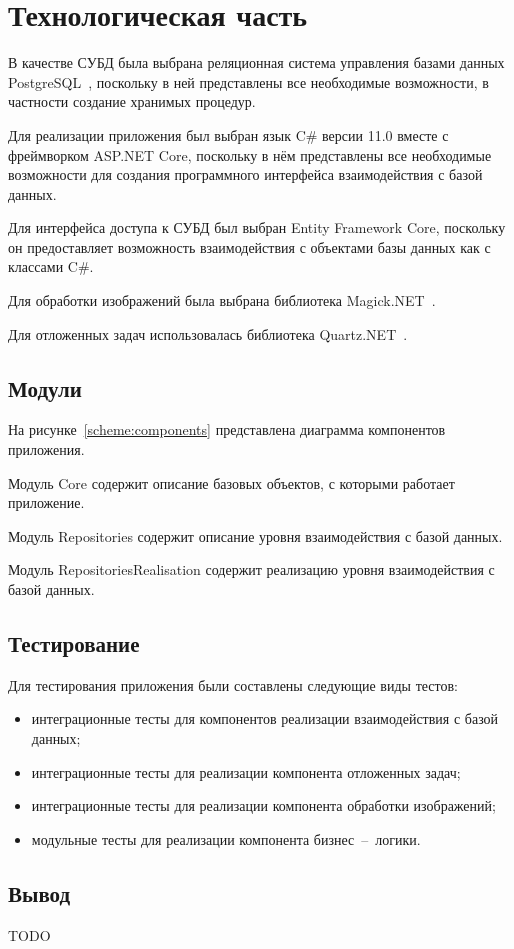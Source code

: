 \chapter{Технологическая часть}

В качестве СУБД была выбрана реляционная система управления базами данных PostgreSQL~\cite{postgresql}, поскольку в ней представлены все необходимые возможности, в частности создание хранимых процедур.

Для реализации приложения был выбран язык C\# версии 11.0 вместе с фреймворком ASP.NET Core, поскольку в нём представлены все необходимые возможности для создания программного интерфейса взаимодействия с базой данных.

Для интерфейса доступа к СУБД был выбран Entity Framework Core, поскольку он предоставляет возможность взаимодействия с объектами базы данных как с классами C\#.

Для обработки изображений была выбрана библиотека Magick.NET~\cite{magicknet}. 

Для отложенных задач использовалась библиотека Quartz.NET~\cite{quartznet}.

\section{Модули}
На рисунке~\ref{scheme:components} представлена диаграмма компонентов приложения.

Модуль Core содержит описание базовых объектов, с которыми работает приложение.

Модуль Repositories содержит описание уровня взаимодействия с базой данных. 

Модуль RepositoriesRealisation содержит реализацию уровня взаимодействия с базой данных. 

\section{Тестирование}

Для тестирования приложения были составлены следующие виды тестов:
\begin{itemize}
	\item интеграционные тесты для компонентов реализации взаимодействия с базой данных;
	\item интеграционные тесты для реализации компонента отложенных задач;
	\item интеграционные тесты для реализации компонента обработки изображений;
	\item модульные тесты для реализации компонента бизнес~--~логики.
\end{itemize}

\section*{Вывод}

TODO

\clearpage
